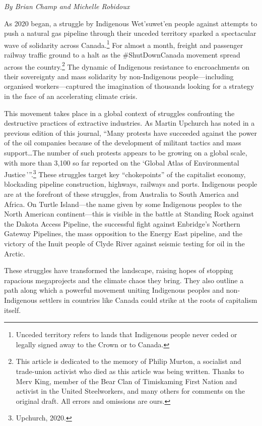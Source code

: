 \emph{By Brian Champ and Michelle Robidoux}

As 2020 began, a struggle by Indigenous Wet'suwet'en people against attempts to push a natural gas pipeline through their unceded territory sparked a spectacular wave of solidarity across Canada.\footnote{Unceded territory refers to lands that Indigenous people never ceded or legally signed away to the Crown or to Canada.} For almost a month, freight and passenger railway traffic ground to a halt as the \#ShutDownCanada movement spread across the country.\footnote{This article is dedicated to the memory of Philip Murton, a socialist and trade-union activist who died as this article was being written. Thanks to Merv King, member of the Bear Clan of Timiskaming First Nation and activist in the United Steelworkers, and many others for comments on the original draft. All errors and omissions are ours.} The dynamic of Indigenous resistance to encroachments on their sovereignty and mass solidarity by non-Indigenous people---including organised workers---captured the imagination of thousands looking for a strategy in the face of an accelerating climate crisis.

This movement takes place in a global context of struggles confronting the destructive practices of extractive industries. As Martin Upchurch has noted in a previous edition of this journal, ``Many protests have succeeded against the power of the oil companies because of the development of militant tactics and mass support\ldots The number of such protests appears to be growing on a global scale, with more than 3,100 so far reported on the `Global Atlas of Environmental Justice\,'''.\footnote{Upchurch, 2020.} These struggles target key ``chokepoints'' of the capitalist economy, blockading pipeline construction, highways, railways and ports. Indigenous people are at the forefront of these struggles, from Australia to South America and Africa. On Turtle Island---the name given by some Indigenous peoples to the North American continent---this is visible in the battle at Standing Rock against the Dakota Access Pipeline, the successful fight against Enbridge's Northern Gateway Pipelines, the mass opposition to the Energy East pipeline, and the victory of the Inuit people of Clyde River against seismic testing for oil in the Arctic.

These struggles have transformed the landscape, raising hopes of stopping rapacious megaprojects and the climate chaos they bring. They also outline a path along which a powerful movement uniting Indigenous peoples and non-Indigenous settlers in countries like Canada could strike at the roots of capitalism itself.

